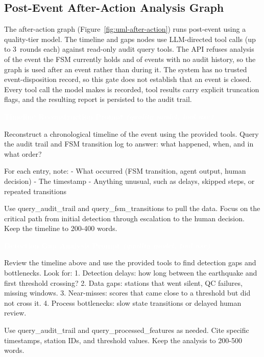 \documentclass{article}
\newcommand{\promptlabel}[2][black!70]{%
  \begin{tcolorbox}[
    enhanced,
    arc=2.5pt,
    boxrule=0pt,
    colback=#1, colframe=#1,
    rounded corners=northwest, rounded corners=northeast,
    sharp corners=south,
    left=8pt, right=8pt, top=3pt, bottom=3pt,
    after skip=-0.6pt, before skip=10pt,
  ]
  \sffamily\small\bfseries\textcolor{white}{#2}
  \end{tcolorbox}%
}
\begin{document}
\subsection{Post-Event After-Action Analysis Graph}

The after-action graph (Figure~\ref{fig:uml-after-action}) runs
post-event using a quality-tier model.  The timeline and gaps nodes use
LLM-directed tool calls (up to 3~rounds each) against read-only audit
query tools.
The API refuses analysis of the event the FSM currently holds and of
events with no audit history, so the graph is used after an event
rather than during it. The system has no trusted event-disposition
record, so this gate does not establish that an event is closed. Every tool call the model makes is recorded,
tool results carry explicit truncation flags, and the resulting report
is persisted to the audit trail.

\promptlabel[promptquality]{Timeline Reconstruction Prompt \normalfont\textnormal{\textit{(quality model, tool use)}}}
\begin{promptbox}
Reconstruct a chronological timeline of the event using the provided tools.
Query the audit trail and FSM transition log to answer: what happened, when,
and in what order?

For each entry, note:
- What occurred (FSM transition, agent output, human decision)
- The timestamp
- Anything unusual, such as delays, skipped steps, or repeated transitions

Use query_audit_trail and query_fsm_transitions to pull the data.
Focus on the critical path from initial detection through escalation to the
human decision. Keep the timeline to 200-400 words.
\end{promptbox}

\promptlabel[promptquality]{Detection Gap Analysis Prompt \normalfont\textnormal{\textit{(quality model, tool use)}}}
\begin{promptbox}
Review the timeline above and use the provided tools to find detection gaps
and bottlenecks. Look for:
1. Detection delays: how long between the earthquake and first threshold
   crossing?
2. Data gaps: stations that went silent, QC failures, missing windows.
3. Near-misses: scores that came close to a threshold but did not cross it.
4. Process bottlenecks: slow state transitions or delayed human review.

Use query_audit_trail and query_processed_features as needed.
Cite specific timestamps, station IDs, and threshold values.
Keep the analysis to 200-500 words.
\end{promptbox}
\end{document}
